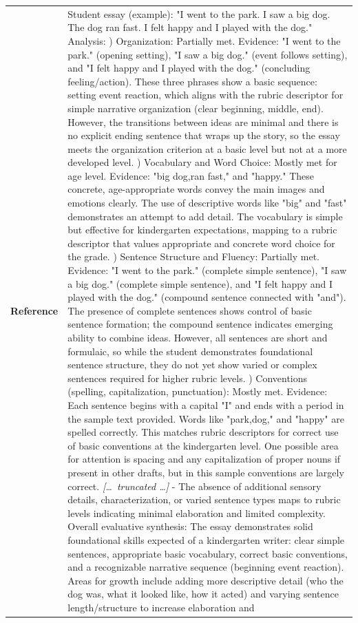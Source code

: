 \begin{longtable}{@{}l p{12.5cm}@{}}
  \textbf{Reference} & Student essay (example): "I went to the park. I saw a big dog. The dog ran fast. I felt happy and I played with the dog." \newline Analysis: \newline 1) Organization: Partially met. Evidence: "I went to the park." (opening setting), "I saw a big dog." (event follows setting), and "I felt happy and I played with the dog." (concluding feeling/action). These three phrases show a basic sequence: setting event reaction, which aligns with the rubric descriptor for simple narrative organization (clear beginning, middle, end). However, the transitions between ideas are minimal and there is no explicit ending sentence that wraps up the story, so the essay meets the organization criterion at a basic level but not at a more developed level. \newline 2) Vocabulary and Word Choice: Mostly met for age level. Evidence: "big dog,ran fast," and "happy." These concrete, age-appropriate words convey the main images and emotions clearly. The use of descriptive words like "big" and "fast" demonstrates an attempt to add detail. The vocabulary is simple but effective for kindergarten expectations, mapping to a rubric descriptor that values appropriate and concrete word choice for the grade. \newline 3) Sentence Structure and Fluency: Partially met. Evidence: "I went to the park." (complete simple sentence), "I saw a big dog." (complete simple sentence), and "I felt happy and I played with the dog." (compound sentence connected with "and"). The presence of complete sentences shows control of basic sentence formation; the compound sentence indicates emerging ability to combine ideas. However, all sentences are short and formulaic, so while the student demonstrates foundational sentence structure, they do not yet show varied or complex sentences required for higher rubric levels. \newline 4) Conventions (spelling, capitalization, punctuation): Mostly met. Evidence: Each sentence begins with a capital "I" and ends with a period in the sample text provided. Words like "park,dog," and "happy" are spelled correctly. This matches rubric descriptors for correct use of basic conventions at the kindergarten level. One possible area for attention is spacing and any capitalization of proper nouns if present in other drafts, but in this sample conventions are largely correct. \newline \textit{[\ldots\ truncated \ldots]} \newline - The absence of additional sensory details, characterization, or varied sentence types maps to rubric levels indicating minimal elaboration and limited complexity. \newline Overall evaluative synthesis: The essay demonstrates solid foundational skills expected of a kindergarten writer: clear simple sentences, appropriate basic vocabulary, correct basic conventions, and a recognizable narrative sequence (beginning event reaction). Areas for growth include adding more descriptive detail (who the dog was, what it looked like, how it acted) and varying sentence length/structure to increase elaboration and 
\end{longtable}
